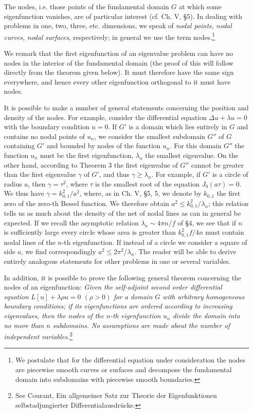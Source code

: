 The nodes, i.e. those points of the fundamental domain $G$ at which some eigenfunction vanishes, are of particular interest (cf. Ch. V, \S5). In dealing with problems in one, two, three, etc. dimensions, we speak of \emph{nodal points, nodal curves, nodal surfaces}, respectively; in general we use the term nodes.\footnote{We postulate that for the differential equation under consideration the nodes are piecewise smooth curves or surfaces and decompose the fundamental domain into subdomains with piecewise smooth boundaries.}

We remark that the first eigenfunction of an eigenvalue problem can have no nodes in the interior of the fundamental domain (the proof of this will follow directly from the theorem given below). It must therefore have the same sign everywhere, and hence every other eigenfunction orthogonal to it must have nodes.

It is possible to make a number of general statements concerning the position and density of the nodes. For example, consider the differential equation $\Delta u+\lambda u=0$ with the boundary condition $u=0$. If $G'$ is a domain which lies entirely in $G$ and contains no nodal points of $u_n$, we consider the smallest subdomain $G''$ of $G$ containing $G'$ and bounded by nodes of the function $u_n$. For this domain $G''$ the function $u_n$ must be the first eigenfunction, $\lambda_n$ the smallest eigenvalue. On the other hand, according to Theorem 3 the first eigenvalue of $G''$ cannot be greater than the first eigenvalue $\gamma$ of $G'$, and thus $\gamma\ge\lambda_n$. For example, if $G'$ is a circle of radius $a$, then $\gamma=\tau^2$, where $\tau$ is the smallest root of the equation $J_0(a\tau)=0$. We thus have $\gamma=k_{0,1}^2/a^2$, where, as in Ch. V, \S5, 5, we denote by $k_{0,1}$ the first zero of the zero-th Bessel function. We therefore obtain $a^2\le k_{0,1}^2/\lambda_n$; this relation tells us as much about the density of the net of nodal lines as can in general be expected. If we recall the asymptotic relation $\lambda_n\sim4\pi n/f$ of \S4, we see that if $n$ is sufficiently large every circle whose area is greater than $k_{0,1}^2f/4n$ must contain nodal lines of the $n$-th eigenfunction. If instead of a circle we consider a square of side $a$, we find correspondingly $a^2\le2\pi^2/\lambda_n$. The reader will be able to derive entirely analogous statements for other problems in one or several variables.

In addition, it is possible to prove the following general theorem concerning the nodes of an eigenfunction: \emph{Given the self-adjoint second order differential equation $L[u]+\lambda\rho u=0$ $(\rho>0)$ for a domain $G$ with arbitrary homogeneous boundary conditions; if its eigenfunctions are ordered according to increasing eigenvalues, then the nodes of the $n$-th eigenfunction $u_n$ divide the domain into no more than $n$ subdomains. No assumptions are made about the number of independent variables.}\footnote{See Courant, Ein allgemeiner Satz zur Theorie der Eigenfunktionen selbstadjungierter Differentialausdrücke.}

